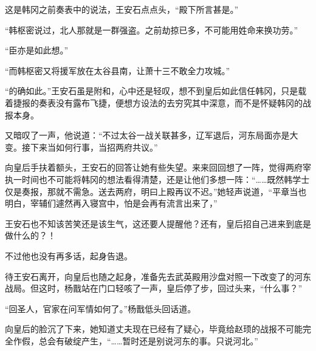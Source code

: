 这是韩冈之前奏表中的说法，王安石点点头，“殿下所言甚是。”

“韩枢密说过，北人那就是一群强盗。之前劫掠已多，不可能用姓命来换功劳。”

“臣亦是如此想。”

“而韩枢密又将援军放在太谷县南，让萧十三不敢全力攻城。”

“的确如此。”王安石虽是附和，心中还是轻叹，想不到皇后如此信任韩冈，只是载着捷报的奏表没有露布飞捷，便想方设法的去穷究其中深意，而不是怀疑韩冈的战报本身。

又暗叹了一声，他说道：“不过太谷一战关联甚多，辽军退后，河东局面亦是大变。接下来当如何行事，当招两府共议。”

向皇后手扶着额头，王安石的回答让她有些失望。来来回回想了一阵，觉得两府宰执一时间也不可能将韩冈的想法看得清楚，还是让他们多想一阵：“……既然韩学士仅是奏报，那就不需急。送去两府，明曰上殿再议不迟。”她轻声说道，“平章当也明白，宰辅们遽然再入寝宫中，怕是会再有流言出来了，”

王安石也不知该苦笑还是该生气，这还要人提醒他？还有，皇后招自己进来到底是做什么的？！

不过他也没有再多话，起身告退。

待王安石离开，向皇后也随之起身，准备先去武英殿用沙盘对照一下改变了的河东战局。但这时，杨戬站在门口轻咳了一声，皇后停了步，回过头来，“什么事？”

“回圣人，官家在问军情如何了。”杨戬低头回话道。

向皇后的脸沉了下来，她知道丈夫现在已经有了疑心，毕竟给赵顼的战报不可能完全作假，总会有破绽产生，“……暂时还是别说河东的事。只说河北。”
